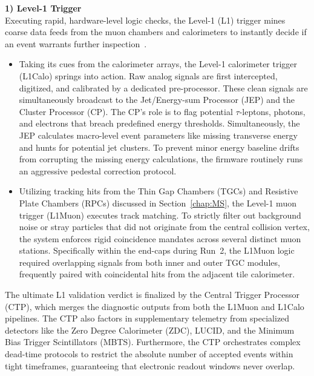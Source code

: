 \noindent\textbf{1) Level-1 Trigger}  \\
Executing rapid, hardware-level logic checks, the Level-1 (L1) trigger mines coarse data feeds from the muon chambers and calorimeters to instantly decide if an event warrants further inspection~\cite{ATLAS-TDR-12}.

\begin{itemize}

\item Taking its cues from the calorimeter arrays, the Level-1 calorimeter trigger (L1Calo) springs into action. Raw analog signals are first intercepted, digitized, and calibrated by a dedicated pre-processor. These clean signals are simultaneously broadcast to the Jet/Energy-sum Processor (JEP) and the Cluster Processor (CP). The CP's role is to flag potential $\tau$-leptons, photons, and electrons that breach predefined energy thresholds. Simultaneously, the JEP calculates macro-level event parameters like missing transverse energy and hunts for potential jet clusters. To prevent minor energy baseline drifts from corrupting the missing energy calculations, the firmware routinely runs an aggressive pedestal correction protocol.

\item Utilizing tracking hits from the Thin Gap Chambers (TGCs) and Resistive Plate Chambers (RPCs) discussed in Section~\ref{chap:MS}, the Level-1 muon trigger (L1Muon) executes track matching. To strictly filter out background noise or stray particles that did not originate from the central collision vertex, the system enforces rigid coincidence mandates across several distinct muon stations. Specifically within the end-caps during Run~2, the L1Muon logic required overlapping signals from both inner and outer TGC modules, frequently paired with coincidental hits from the adjacent tile calorimeter.

\end{itemize}

The ultimate L1 validation verdict is finalized by the Central Trigger Processor (CTP), which merges the diagnostic outputs from both the L1Muon and L1Calo pipelines. The CTP also factors in supplementary telemetry from specialized detectors like the Zero Degree Calorimeter (ZDC), LUCID, and the Minimum Bias Trigger Scintillators (MBTS). Furthermore, the CTP orchestrates complex dead-time protocols to restrict the absolute number of accepted events within tight timeframes, guaranteeing that electronic readout windows never overlap.

